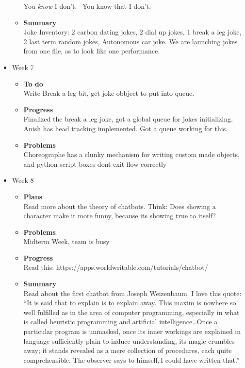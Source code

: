 \begin{itemize}
\begin{itemize}
			You \textit{know} I don’t. \ You know that I don’t.
				\item \textbf{Summary} \\
				Joke Inventory: 2 carbon dating jokes, 2 dial up jokes, 1 break a leg joke, 2 last term random jokes, Autonomous car joke. We are launching jokes from one file, as to look like one performance.
			\end{itemize}
		\item{Week 7}
			\begin{itemize}
				\item \textbf{To do} \\
					Write Break a leg bit, get joke obbject to put into queue.
				\item \textbf{Progress} \\
					Finalized the break a leg joke, got a global queue for jokes initializing. Anish has head tracking implemented. Got a queue working for this.
				\item \textbf{Problems} \\
					Choreographe has a clunky mechanism for writing custom made objects, and python script boxes dont exit flow correctly
			\end{itemize}
		\item{Week 8}
			\begin{itemize}
				\item \textbf{Plans} \\
				Read more about the theory of chatbots. Think: Does showing a character make it more funny, because its showing true to itself?
				\item \textbf{Problems} \\
				Midterm Week, team is busy
				\item \textbf{Progress} \\
				Read this: https://apps.worldwritable.com/tutorials/chatbot/
				\item \textbf{Summary} \\
				Read about the first chatbot from Joseph Weizenbaum.
				I love this quote:
				“It is said that to explain is to explain away. This maxim is nowhere so well fulfilled as in the area of computer programming, especially in what is called heuristic programming and artificial intelligence…Once a particular program is unmasked, once its inner workings are explained in language sufficiently plain to induce understanding, its magic crumbles away; it stands revealed as a mere collection of procedures, each quite comprehensible. The observer says to himself, I could have written that.” 


\end{itemize}
\end{itemize}
